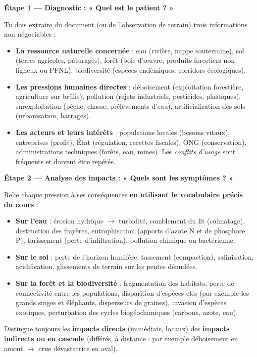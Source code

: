 \documentclass[11pt]{article}
\begin{document}
\textbf{Étape 1 — Diagnostic : « Quel est le patient ? »}\par
Tu dois extraire du document (ou de l'observation de terrain) trois informations non négociables :
\begin{itemize}
    \item \textbf{La ressource naturelle concernée} : eau (rivière, nappe souterraine), sol (terres agricoles, pâturages), forêt (bois d'œuvre, produits forestiers non ligneux ou PFNL), biodiversité (espèces endémiques, corridors écologiques).
    \item \textbf{Les pressions humaines directes} : déboisement (exploitation forestière, agriculture sur brûlis), pollution (rejets industriels, pesticides, plastiques), surexploitation (pêche, chasse, prélèvements d'eau), artificialisation des sols (urbanisation, barrages).
    \item \textbf{Les acteurs et leurs intérêts} : populations locales (besoins vitaux), entreprises (profit), État (régulation, recettes fiscales), ONG (conservation), administrations techniques (forêts, eau, mines). Les \emph{conflits d'usage} sont fréquents et doivent être repérés.
\end{itemize}

\textbf{Étape 2 — Analyse des impacts : « Quels sont les symptômes ? »}\par
Relie chaque pression à ses conséquences \textbf{en utilisant le vocabulaire précis du cours} :
\begin{itemize}
    \item \textbf{Sur l'eau} : érosion hydrique $\rightarrow$ turbidité, comblement du lit (colmatage), destruction des frayères, eutrophisation (apports d'azote N et de phosphore P), tarissement (perte d'infiltration), pollution chimique ou bactérienne.
    \item \textbf{Sur le sol} : perte de l'horizon humifère, tassement (compaction), salinisation, acidification, glissements de terrain sur les pentes dénudées.
    \item \textbf{Sur la forêt et la biodiversité} : fragmentation des habitats, perte de connectivité entre les populations, disparition d'espèces clés (par exemple les grands singes et éléphants, disperseurs de graines), invasion d'espèces exotiques, perturbation des cycles biogéochimiques (carbone, azote, eau).
\end{itemize}
Distingue toujours les \textbf{impacts directs} (immédiats, locaux) des \textbf{impacts indirects ou en cascade} (différés, à distance : par exemple déboisement en amont $\rightarrow$ crue dévastatrice en aval).
\end{document}
